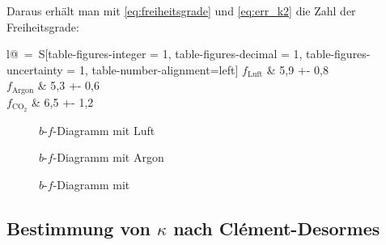 Daraus erhält man mit \eqref{eq:freiheitsgrade} und \eqref{eq:err_k2} die Zahl der Freiheitsgrade: \newline
\begin{tabular}{l@{$~=~$}S[table-figures-integer = 1, table-figures-decimal = 1, table-figures-uncertainty = 1, table-number-alignment=left]}
	$ f_\mathrm{Luft} $ & 5,9 +- 0,8 \\
	$ f_\mathrm{Argon} $ & 5,3 +- 0,6 \\
	$ f_{\mathrm{CO}_2} $ & 6,5 +- 1,2
\end{tabular}

\begin{figure}[H]
\centering

\caption{$ b $-$ f $-Diagramm mit Luft}
\label{fig:luft}
\end{figure}

\begin{figure}[H]
\centering

\caption{$ b $-$ f $-Diagramm mit Argon}
\label{fig:ar}
\end{figure}

\begin{figure}[H]
\centering

\caption{$ b $-$ f $-Diagramm mit }
\label{fig:co2}
\end{figure}

\subsection{Bestimmung von $ \kappa $ nach Clément-Desormes}
